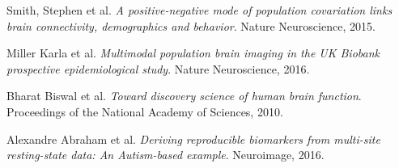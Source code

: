 \documentclass[12pt]{article}
\begin{document}
\begin{thebibliography}{9}
        Smith, Stephen et al. 
        \textit{A positive-negative mode of population covariation links brain
        connectivity, demographics and behavior}. 
        Nature Neuroscience, 2015.
         
        Miller Karla et al. 
        \textit{{Multimodal population brain imaging in the UK Biobank prospective
    epidemiological study}}. Nature Neuroscience, 2016.
         
        Bharat Biswal et al.
        \textit{Toward discovery science of human brain function}.
        Proceedings of the National Academy of Sciences, 2010.

        Alexandre Abraham et al.
        \textit{Deriving reproducible biomarkers from multi-site
        resting-state data: An Autism-based example}.
        Neuroimage, 2016.
\end{thebibliography}
\end{document}
